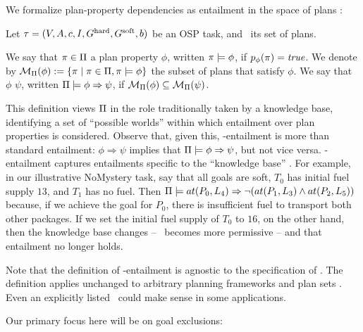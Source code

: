 We formalize plan-property dependencies as entailment in the space of
plans \plans:

\begin{definition}
\label{def:pi-entailment}
Let $\tau =
(V,\allowbreak A,\allowbreak{\ensuremath{c}},\allowbreak I,\allowbreak G^{\text{\textup{hard}}},\allowbreak G^{\text{\textup{soft}}},\allowbreak{\ensuremath{b}})$
be an OSP task, and \plans\ its set of plans.

We say that $\pi \in \Pi$  a plan property
$\phi$, written $\pi \models \phi$, if $p_\phi(\pi) =
\mathit{true}$. We denote by ${\cal M}_{\Pi}(\phi) := \{\pi \mid \pi
\in \Pi, \pi \models \phi\}$ the subset of plans that satisfy
$\phi$.
%
%
We say that $\phi$  $\psi$, written
$\Pi \models \phi \Rightarrow \psi$, if ${\cal M}_{\Pi}(\phi) \subseteq
{\cal M}_{\Pi}(\psi)$.
%
\end{definition}

This definition views $\Pi$ in the role traditionally taken by a
knowledge base, identifying a set of ``possible worlds'' within which
entailment over plan properties is considered.
%
Observe that, given this, \plans-entailment is more than standard
entailment: $\phi \Rightarrow \psi$ implies that
$\Pi \models \phi \Rightarrow \psi$, but not vice versa. \plans-entailment
captures entailments specific to the ``knowledge base'' \plans. For
example, in our illustrative NoMystery task, say that all goals are
soft, $T_0$ has initial fuel supply $13$, and $T_1$ has no fuel. Then
$\Pi \models at(P_0,L_4) \Rightarrow \neg (at(P_1,L_3) \wedge at(P_2,L_5))$
because, if we achieve the goal for $P_0$, there is insufficient fuel
to transport both other packages. If we set the initial fuel supply of
$T_0$ to $16$, on the other hand, then the knowledge base changes --
\plans\ becomes more permissive -- and that entailment no longer
holds.
%

Note that the definition of \plans-entailment is agnostic to the
specification of \plans. The definition applies unchanged to arbitrary
planning frameworks and plan sets \plans. Even an explicitly listed
\plans\ could make sense in some applications.

Our primary focus here will be on goal exclusions:

